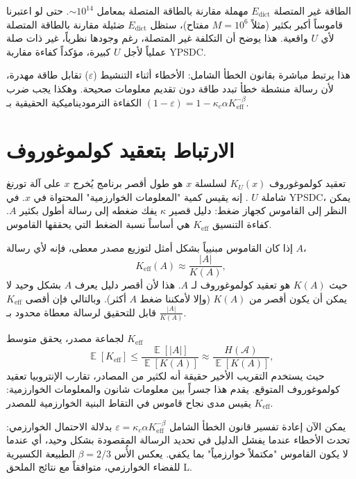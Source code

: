 \documentclass[12pt,a4paper]{article}
\newcommand{\Keff}{K_{\mathrm{eff}}}
\DeclareMathOperator{\E}{\mathbb{E}}
\theoremstyle{remark}
\begin{document}
	الطاقة غير المتصلة \(E_{\text{dict}}\) مهملة مقارنة بالطاقة المتصلة بمعامل \(\sim 10^{14}\). حتى لو اعتبرنا قاموساً أكبر بكثير (مثلاً \(M = 10^6\) مفتاح)، ستظل \(E_{\text{dict}}\) ضئيلة مقارنة بالطاقة المتصلة لأي \(U\) واقعية. هذا يوضح أن التكلفة غير المتصلة، رغم وجودها نظرياً، غير ذات صلة عملياً لأجل \(U\) كبيرة، مؤكداً كفاءة مقاربة YPSDC.
	
	هذا يرتبط مباشرة بقانون الخطأ الشامل: الأخطاء أثناء التنشيط (\(\varepsilon\)) تقابل طاقة مهدرة، لأن رسالة منشطة خطأ تبدد طاقة دون تقديم معلومات صحيحة. وهكذا يجب ضرب الكفاءة الترموديناميكية الحقيقية بـ \((1-\varepsilon) = 1 - \kappa_c\alpha K_{\mathrm{eff}}^{-\beta}\).
	
	\section{الارتباط بتعقيد كولموغوروف}
	\label{sec:kolmogorov}
	
	تعقيد كولموغوروف \(K_U(x)\) لسلسلة \(x\) هو طول أقصر برنامج يُخرج \(x\) على آلة تورنغ شاملة \(U\) \cite{Kolmogorov1965}. إنه يقيس كمية "المعلومات الخوارزمية" المحتواة في \(x\). في YPSDC، يمكن النظر إلى القاموس كجهاز ضغط: دليل قصير \(\kappa\) يفك ضغطه إلى رسالة أطول بكثير \(A\). كفاءة التنسيق \(\Keff\) هي أساساً نسبة الضغط التي يحققها القاموس.
	
	إذا كان القاموس مبنيياً بشكل أمثل لتوزيع مصدر معطى، فإنه لأي رسالة \(A\)،
	\begin{equation}
		\Keff(A) \approx \frac{|A|}{K(A)}, \label{eq:kolmogorov}
	\end{equation}
	حيث \(K(A)\) هو تعقيد كولموغوروف لـ \(A\). هذا لأن أقصر دليل يعرف \(A\) بشكل وحيد لا يمكن أن يكون أقصر من \(K(A)\) (وإلا لأمكننا ضغط \(A\) أكثر). وبالتالي فإن أقصى \(\Keff\) قابل للتحقيق لرسالة معطاة محدود بـ \(\frac{|A|}{K(A)}\).
	
	لجماعة مصدر، يحقق متوسط \(\Keff\)
	\begin{equation}
		\E[\Keff] \le \frac{\E[|A|]}{\E[K(A)]} \approx \frac{H(\mathcal{A})}{\E[K(A)]},
	\end{equation}
	حيث يستخدم التقريب الأخير حقيقة أنه لكثير من المصادر، تقارب الإنتروبيا تعقيد كولموغوروف المتوقع. يقدم هذا جسراً بين معلومات شانون والمعلومات الخوارزمية: \(\Keff\) يقيس مدى نجاح قاموس في التقاط البنية الخوارزمية للمصدر.
	
	يمكن الآن إعادة تفسير قانون الخطأ الشامل \(\varepsilon = \kappa_c \alpha K_{\mathrm{eff}}^{-\beta}\) بدلالة الاحتمال الخوارزمي: تحدث الأخطاء عندما يفشل الدليل في تحديد الرسالة المقصودة بشكل وحيد، أي عندما لا يكون القاموس "مكتملاً خوارزمياً" بما يكفي. يعكس الأُس \(\beta = 2/3\) الطبيعة الكسيرية للفضاء الخوارزمي، متوافقاً مع نتائج الملحق L.
	
\end{document}
